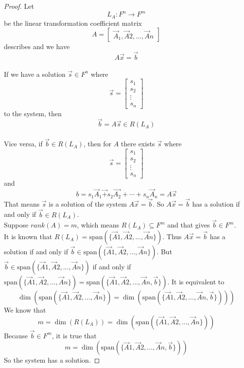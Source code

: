 \begin{homeworkProblem}
\solution

\begin{proof}
    Let \[L_A: F^{n} \rightarrow F^{m}\] be the linear transformation coefficient matrix \[
        A = \begin{bmatrix}\vec{A}_1, \vec{A}2,..., \vec{A}n\end{bmatrix} \]
    describes and we have \[
        A\vec{x} = \vec{b}
    \]\\

    If we have a solution $\vec{s} \in F^n$ where \[
    \vec{s} = \begin{bmatrix}
        s_1 \\ s_2 \\ \vdots \\ s_n
    \end{bmatrix}
    \]  to the system,
    then \[
    \vec{b} = A\vec{s} \in R(L_A)
    \]\\
    Vice versa, if $\vec{b} \in R(L_A)$, then for $A$ there exists $\vec{s}$ where \[
        \vec{s} = \begin{bmatrix}
            s_1 \\ s_2 \\ \vdots \\ s_n
        \end{bmatrix}
        \] and \[
    b = s_1\vec{A}_1\vec + s_2\vec{A_2} + \cdots + s_n\vec{A}_n =A\vec{s}
        \]
    That means $\vec{s}$ is a solution of the system $A\vec{x} = \vec{b}$. So $A\vec{x} = \vec{b}$ has a solution if and only if $\vec{b} \in R(L_A)$.\\

    Suppose $rank(A) = m$, which means $R(L_A) \subseteq F^{m}$ and that gives $
    \vec{b} \in F^m$.
    \\
    It is known that $R(L_A) = \text{span}(\{\vec{A}1, \vec{A}2, ..., \vec{A}n\})$. Thus $A\vec{x} = \vec{b}$ has a solution if and only if $\vec{b} \in \text{span}(\{\vec{A}1, \vec{A}2, ..., \vec{A}n\})$. But $\vec{b} \in \text{span}(\{\vec{A}1, \vec{A}2, ..., \vec{A}n\})$ if and only if $\text{span}(\{\vec{A}1, \vec{A}2, ..., \vec{A}n\}) = \text{span}(\{\vec{A}1, \vec{A}2, ..., \vec{A}n, \vec{b}\})$. It is equivalent to \[
    \dim(\text{span}(\{\vec{A}1, \vec{A}2, ..., \vec{A}n\}) = \dim(\text{span}(\{\vec{A}1, \vec{A}2, ..., \vec{A}n, \vec{b}\})))
    \]
    We know that \[
    m = \dim(R(L_A)) = \dim(\text{span}(\{\vec{A}1, \vec{A}2, ..., \vec{A}n\}))
    \]
    Because $\vec{b} \in F^{m}$, it is true that \[
    m = \dim(\text{span}(\{\vec{A}1, \vec{A}2, ..., \vec{A}n, \vec{b}\}))
    \]
    So the system has a solution.
\end{proof}
\end{homeworkProblem}

